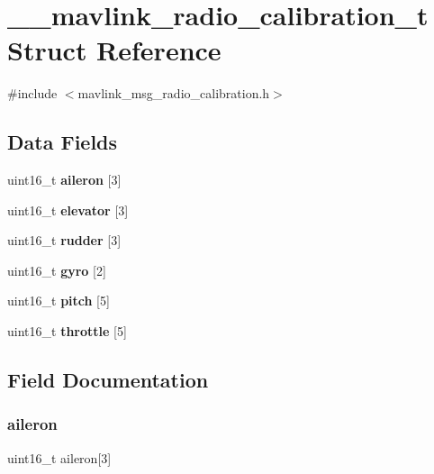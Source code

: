 \section{\+\_\+\+\_\+mavlink\+\_\+radio\+\_\+calibration\+\_\+t Struct Reference}
\label{struct____mavlink__radio__calibration__t}


{\ttfamily \#include $<$mavlink\+\_\+msg\+\_\+radio\+\_\+calibration.\+h$>$}

\subsection*{Data Fields}
\begin{DoxyCompactItemize}
\item 
uint16\+\_\+t \textbf{ aileron} [3]
\item 
uint16\+\_\+t \textbf{ elevator} [3]
\item 
uint16\+\_\+t \textbf{ rudder} [3]
\item 
uint16\+\_\+t \textbf{ gyro} [2]
\item 
uint16\+\_\+t \textbf{ pitch} [5]
\item 
uint16\+\_\+t \textbf{ throttle} [5]
\end{DoxyCompactItemize}


\subsection{Field Documentation}
\mbox{\label{struct____mavlink__radio__calibration__t_a613f15d194bf5650b19773d8e84291f5}} 
\subsubsection{aileron}
{\footnotesize\ttfamily uint16\+\_\+t aileron[3]}

\mbox{\label{struct____mavlink__radio__calibration__t_a6d714e8f088853a7371b654cfca795d2}} 
